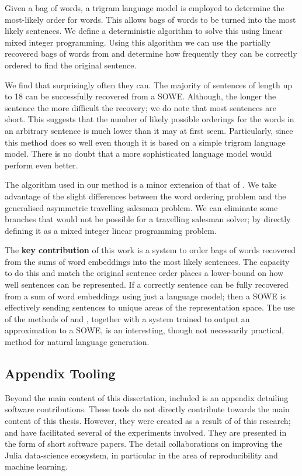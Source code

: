 \documentclass{book}
\begin{document}
Given a bag of words,
a trigram language model is employed to determine the most-likely order for words.
This allows bags of words to be turned into the most likely sentences.
We define a deterministic algorithm to solve this using linear mixed integer programming.
Using this algorithm we can use the partially recovered bags of words from  and determine how frequently they can be correctly ordered to find the original sentence.

We find that surprisingly often they can.
The majority of sentences of length up to 18 can be successfully recovered from a SOWE.
Although, the longer the sentence the more difficult the recovery;
we do note that most sentences are short.
This suggests that the number of likely possible orderings for the words in an arbitrary sentence is much lower than it may at first seem.
Particularly, since this method does so well even though it is based on a simple trigram language model.
There is no doubt that a more sophisticated language model would perform even better.


The algorithm used in our method is a minor extension of that of \citet{Horvat2014}.
We take advantage of the slight differences between the word ordering problem and the generalised asymmetric travelling salesman problem.
We can eliminate some branches that would not be possible for a travelling salesman solver; by directly defining it as a mixed integer linear programming problem.


The \textbf{key contribution} of this work is a system to order bags of words recovered from the sums of word embeddings into the most likely sentences.
The capacity to do this and match the original sentence order places a lower-bound on how well sentences can be represented.
If a correctly sentence can be fully recovered from a sum of word embeddings using just a language model;
then a SOWE is effectively sending sentences to unique areas of the representation space.
The use of the methods of  and ,
together with a system trained to output an approximation to a SOWE, is an interesting, though not necessarily practical, method for natural language generation.

\subsection*{ Appendix Tooling}
Beyond the main content of this dissertation,
included is an appendix detailing software contributions.
These tools do not directly contribute towards the main content of this thesis.
However, they were created as a result of of this research;
and have facilitated several of the experiments involved.
They are presented in the form of short software papers.
The detail collaborations on improving the Julia \citep{Julia} data-science ecosystem,
in particular in the area of reproducibility and machine learning.
\end{document}
